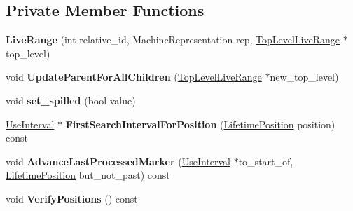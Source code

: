 \subsection*{Private Member Functions}
\begin{DoxyCompactItemize}
\item 
{\bfseries Live\+Range} (int relative\+\_\+id, Machine\+Representation rep, \hyperlink{classv8_1_1internal_1_1compiler_1_1_top_level_live_range}{Top\+Level\+Live\+Range} $\ast$top\+\_\+level)\hypertarget{classv8_1_1internal_1_1compiler_1_1_live_range_ac0688b1e19e8c5c4c8350ba37325e2ce}{}\label{classv8_1_1internal_1_1compiler_1_1_live_range_ac0688b1e19e8c5c4c8350ba37325e2ce}

\item 
void {\bfseries Update\+Parent\+For\+All\+Children} (\hyperlink{classv8_1_1internal_1_1compiler_1_1_top_level_live_range}{Top\+Level\+Live\+Range} $\ast$new\+\_\+top\+\_\+level)\hypertarget{classv8_1_1internal_1_1compiler_1_1_live_range_a5aa25b10065a68e4d79543ba0fa41cbf}{}\label{classv8_1_1internal_1_1compiler_1_1_live_range_a5aa25b10065a68e4d79543ba0fa41cbf}

\item 
void {\bfseries set\+\_\+spilled} (bool value)\hypertarget{classv8_1_1internal_1_1compiler_1_1_live_range_a3f6d6b153c6df84ed06ea6bd574659a0}{}\label{classv8_1_1internal_1_1compiler_1_1_live_range_a3f6d6b153c6df84ed06ea6bd574659a0}

\item 
\hyperlink{classv8_1_1internal_1_1compiler_1_1_use_interval}{Use\+Interval} $\ast$ {\bfseries First\+Search\+Interval\+For\+Position} (\hyperlink{classv8_1_1internal_1_1compiler_1_1_lifetime_position}{Lifetime\+Position} position) const \hypertarget{classv8_1_1internal_1_1compiler_1_1_live_range_af64f621fb114f61f1cf1465841836b34}{}\label{classv8_1_1internal_1_1compiler_1_1_live_range_af64f621fb114f61f1cf1465841836b34}

\item 
void {\bfseries Advance\+Last\+Processed\+Marker} (\hyperlink{classv8_1_1internal_1_1compiler_1_1_use_interval}{Use\+Interval} $\ast$to\+\_\+start\+\_\+of, \hyperlink{classv8_1_1internal_1_1compiler_1_1_lifetime_position}{Lifetime\+Position} but\+\_\+not\+\_\+past) const \hypertarget{classv8_1_1internal_1_1compiler_1_1_live_range_af1c3836efc8e2a7550fc4bac4e97f998}{}\label{classv8_1_1internal_1_1compiler_1_1_live_range_af1c3836efc8e2a7550fc4bac4e97f998}

\item 
void {\bfseries Verify\+Positions} () const \hypertarget{classv8_1_1internal_1_1compiler_1_1_live_range_a0e49f766b5e7dc72d3d388b6d2d3268f}{}\label{classv8_1_1internal_1_1compiler_1_1_live_range_a0e49f766b5e7dc72d3d388b6d2d3268f}


\end{DoxyCompactItemize}
